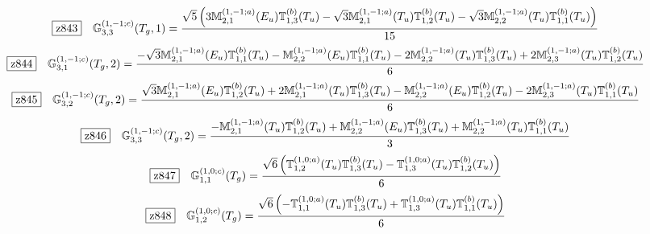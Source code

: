 \documentclass[fleqn,10pt,landscape]{jsarticle}
\begin{document}
\begin{dmath*}
\hspace*{3mm}\fbox{z843}\quad \mathbb{G}_{3,3}^{(1,-1;c)}(T_{g},1)=\frac{\sqrt{5} \left(3 \mathbb{M}_{2,1}^{(1,-1;a)}(E_{u}) \mathbb{T}_{1,3}^{(b)}(T_{u}) - \sqrt{3} \mathbb{M}_{2,1}^{(1,-1;a)}(T_{u}) \mathbb{T}_{1,2}^{(b)}(T_{u}) - \sqrt{3} \mathbb{M}_{2,2}^{(1,-1;a)}(T_{u}) \mathbb{T}_{1,1}^{(b)}(T_{u})\right)}{15}
\end{dmath*}
\begin{dmath*}
\hspace*{3mm}\fbox{z844}\quad \mathbb{G}_{3,1}^{(1,-1;c)}(T_{g},2)=\frac{- \sqrt{3} \mathbb{M}_{2,1}^{(1,-1;a)}(E_{u}) \mathbb{T}_{1,1}^{(b)}(T_{u}) - \mathbb{M}_{2,2}^{(1,-1;a)}(E_{u}) \mathbb{T}_{1,1}^{(b)}(T_{u}) - 2 \mathbb{M}_{2,2}^{(1,-1;a)}(T_{u}) \mathbb{T}_{1,3}^{(b)}(T_{u}) + 2 \mathbb{M}_{2,3}^{(1,-1;a)}(T_{u}) \mathbb{T}_{1,2}^{(b)}(T_{u})}{6}
\end{dmath*}
\begin{dmath*}
\hspace*{3mm}\fbox{z845}\quad \mathbb{G}_{3,2}^{(1,-1;c)}(T_{g},2)=\frac{\sqrt{3} \mathbb{M}_{2,1}^{(1,-1;a)}(E_{u}) \mathbb{T}_{1,2}^{(b)}(T_{u}) + 2 \mathbb{M}_{2,1}^{(1,-1;a)}(T_{u}) \mathbb{T}_{1,3}^{(b)}(T_{u}) - \mathbb{M}_{2,2}^{(1,-1;a)}(E_{u}) \mathbb{T}_{1,2}^{(b)}(T_{u}) - 2 \mathbb{M}_{2,3}^{(1,-1;a)}(T_{u}) \mathbb{T}_{1,1}^{(b)}(T_{u})}{6}
\end{dmath*}
\begin{dmath*}
\hspace*{3mm}\fbox{z846}\quad \mathbb{G}_{3,3}^{(1,-1;c)}(T_{g},2)=\frac{- \mathbb{M}_{2,1}^{(1,-1;a)}(T_{u}) \mathbb{T}_{1,2}^{(b)}(T_{u}) + \mathbb{M}_{2,2}^{(1,-1;a)}(E_{u}) \mathbb{T}_{1,3}^{(b)}(T_{u}) + \mathbb{M}_{2,2}^{(1,-1;a)}(T_{u}) \mathbb{T}_{1,1}^{(b)}(T_{u})}{3}
\end{dmath*}
\begin{dmath*}
\hspace*{3mm}\fbox{z847}\quad \mathbb{G}_{1,1}^{(1,0;c)}(T_{g})=\frac{\sqrt{6} \left(\mathbb{T}_{1,2}^{(1,0;a)}(T_{u}) \mathbb{T}_{1,3}^{(b)}(T_{u}) - \mathbb{T}_{1,3}^{(1,0;a)}(T_{u}) \mathbb{T}_{1,2}^{(b)}(T_{u})\right)}{6}
\end{dmath*}
\begin{dmath*}
\hspace*{3mm}\fbox{z848}\quad \mathbb{G}_{1,2}^{(1,0;c)}(T_{g})=\frac{\sqrt{6} \left(- \mathbb{T}_{1,1}^{(1,0;a)}(T_{u}) \mathbb{T}_{1,3}^{(b)}(T_{u}) + \mathbb{T}_{1,3}^{(1,0;a)}(T_{u}) \mathbb{T}_{1,1}^{(b)}(T_{u})\right)}{6}
\end{dmath*}
\end{document}
